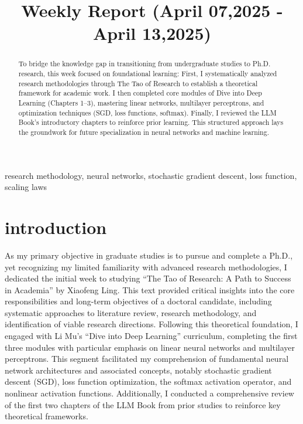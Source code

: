 \documentclass[conference]{IEEEtran}
\title{Weekly Report (April 07,2025 - April 13,2025)}
\author{\IEEEauthorblockN{1\textsuperscript{st}Xiaosong Yuan}
\IEEEauthorblockA{\textit{AISIG}\\
\textit{Shanghai Jiao Tong University}\\Shanghai, China\\yuanxiaosong1999@gmail.com}}
\begin{document}
\maketitle


\begin{abstract}
To bridge the knowledge gap in transitioning from undergraduate studies to Ph.D. research, this week focused on foundational learning: First, I systematically analyzed research methodologies through The Tao of Research to establish a theoretical framework for academic work. I then completed core modules of Dive into Deep Learning (Chapters 1–3), mastering linear networks, multilayer perceptrons, and optimization techniques (SGD, loss functions, softmax). Finally, I reviewed the LLM Book’s introductory chapters to reinforce prior learning. This structured approach lays the groundwork for future specialization in neural networks and machine learning.
\end{abstract}

\begin{IEEEkeywords}
research methodology, neural networks, stochastic gradient descent, loss function, scaling laws
\end {IEEEkeywords}

\section{introduction}
As my primary objective in graduate studies is to pursue and complete a Ph.D., yet recognizing my limited familiarity with advanced research methodologies, I dedicated the initial week to studying “The Tao of Research: A Path to Success in Academia” by Xiaofeng Ling. This text provided critical insights into the core responsibilities and long-term objectives of a doctoral candidate, including systematic approaches to literature review, research methodology, and identification of viable research directions. Following this theoretical foundation, I engaged with Li Mu's “Dive into Deep Learning” curriculum, completing the first three modules with particular emphasis on linear neural networks and multilayer perceptrons. This segment facilitated my comprehension of fundamental neural network architectures and associated concepts, notably stochastic gradient descent (SGD), loss function optimization, the softmax activation operator, and nonlinear activation functions. Additionally, I conducted a comprehensive review of the first two chapters of the LLM Book from prior studies to reinforce key theoretical frameworks.
\end{document}
